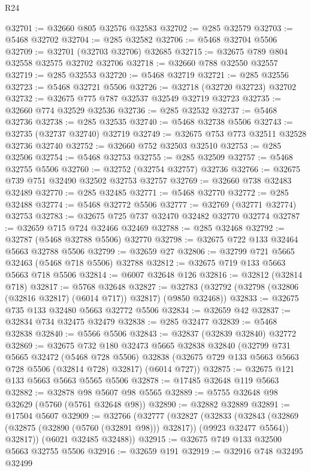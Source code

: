 \begin{lexlean}{R24}
\begin{coremodule}
@32701 := @32660 @805 @32576 @32583
@32702 := @285 @32579
@32703 := @5468 @32702
@32704 := @285 @32582
@32706 := @5468 @32704 @5506
@32709 := @32701 (@32703 @32706) @32685
@32715 := @32675 @789 @804 @32558 @32575 @32702 @32706
@32718 := @32660 @788 @32550 @32557
@32719 := @285 @32553
@32720 := @5468 @32719
@32721 := @285 @32556
@32723 := @5468 @32721 @5506
@32726 := @32718 (@32720 @32723) @32702
@32732 := @32675 @775 @787 @32537 @32549 @32719 @32723
@32735 := @32660 @774 @32529 @32536
@32736 := @285 @32532
@32737 := @5468 @32736
@32738 := @285 @32535
@32740 := @5468 @32738 @5506
@32743 := @32735 (@32737 @32740) @32719
@32749 := @32675 @753 @773 @32511 @32528 @32736 @32740
@32752 := @32660 @752 @32503 @32510
@32753 := @285 @32506
@32754 := @5468 @32753
@32755 := @285 @32509
@32757 := @5468 @32755 @5506
@32760 := @32752 (@32754 @32757) @32736
@32766 := @32675 @739 @751 @32490 @32502 @32753 @32757
@32769 := @32660 @738 @32483 @32489
@32770 := @285 @32485
@32771 := @5468 @32770
@32772 := @285 @32488
@32774 := @5468 @32772 @5506
@32777 := @32769 (@32771 @32774) @32753
@32783 := @32675 @725 @737 @32470 @32482 @32770 @32774
@32787 := @32659 @715 @724 @32466 @32469
@32788 := @285 @32468
@32792 := @32787 (@5468 @32788 @5506) @32770
@32798 := @32675 @722 @133 @32464 @5663 @32788 @5506
@32799 := @32659 @27
@32806 := @32799 @721 @5665 @32463 (@5468 @718 @5506) @32788
@32812 := @32675 @719 @133 @5663 @5663 @718 @5506
@32814 := @6007 @32648 @126
@32816 := @32812 (@32814 @718)
@32817 := @5768 @32648
@32827 := @32783 (@32792 (@32798 (@32806 (@32816 @32817) (@6014 @717)) @32817) (@9850 @32468))
@32833 := @32675 @735 @133 @32480 @5663 @32772 @5506
@32834 := @32659 @42
@32837 := @32834 @734 @32475 @32479
@32838 := @285 @32477
@32839 := @5468 @32838
@32840 := @5566 @5506
@32843 := @32837 (@32839 @32840) @32772
@32869 := @32675
    @732
    @180
    @32473
    @5665
    @32838
    @32840
    (@32799
      @731
      @5665
      @32472
      (@5468 @728 @5506)
      @32838
      (@32675 @729 @133 @5663 @5663 @728 @5506 (@32814 @728) @32817)
      (@6014 @727))
@32875 := @32675 @121 @133 @5663 @5663 @5565 @5506
@32878 := @17485 @32648 @119 @5663
@32882 := @32878 @98 @5607 @98 @5565
@32889 := @5755 @32648 @98 @32629 (@5760 (@5761 @32648 @98))
@32890 := @32882 @32889
@32891 := @17504 @5607
@32909 := @32766
    (@32777
      (@32827
        (@32833
          (@32843 (@32869 (@32875 (@32890 (@5760 (@32891 @98))) @32817)) (@9923 @32477 @5564))
          @32817))
      (@6021 @32485 @32488))
@32915 := @32675 @749 @133 @32500 @5663 @32755 @5506
@32916 := @32659 @191
@32919 := @32916 @748 @32495 @32499

\end{coremodule}
\end{lexlean}
